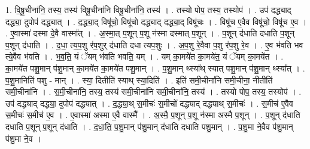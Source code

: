 \documentclass[17pt]{extarticle}
\begin{document}
1. वि॒षू॒चीना॑नि॒ तस्य॒ तस्य॑ विषू॒चीना॑नि विषू॒चीना॑नि॒ तस्य॑ । . तस्यो पोप॒ तस्य॒ तस्योप॑ । . उप॑ दद्ध्याद् दद्ध्या॒ दुपोप॑ दद्ध्यात् । . द॒द्ध्या॒द् विषू॑चो॒ विषू॑चो दद्ध्याद् दद्ध्या॒द् विषू॑चः । . विषू॑च ए॒वैव विषू॑चो॒ विषू॑च ए॒व । . ए॒वास्मा॑ दस्मा दे॒वै वास्मा᳚त् । . अ॒स्मा॒त् प॒शून् प॒शू न॑स्मा दस्मात् प॒शून् । . प॒शून् द॑धाति दधाति प॒शून् प॒शून् द॑धाति । . द॒धा॒ त्य॒प॒शु र॑प॒शुर् द॑धाति दधा त्यप॒शुः । . अ॒प॒शु रे॒वैवा प॒शु र॑प॒शु रे॒व । . ए॒व भ॑वति भव त्ये॒वैव भ॑वति । . भ॒व॒ति॒ यं ॅयम् भ॑वति भवति॒ यम् । . यम् का॒मये॑त का॒मये॑त॒ यं ॅयम् का॒मये॑त । . का॒मये॑त पशु॒मान् प॑शु॒मान् का॒मये॑त का॒मये॑त पशु॒मान् । . प॒शु॒मान् थ्स्या᳚थ् स्यात् पशु॒मान् प॑शु॒मान् थ्स्या᳚त् । . प॒शु॒मानिति॑ पशु - मान् । . स्या॒ दितीति॑ स्याथ् स्या॒दिति॑ । . इति॑ समी॒चीना॑नि समी॒चीना॒ नीतीति॑ समी॒चीना॑नि । . स॒मी॒चीना॑नि॒ तस्य॒ तस्य॑ समी॒चीना॑नि समी॒चीना॑नि॒ तस्य॑ । . तस्यो पोप॒ तस्य॒ तस्योप॑ । . उप॑ दद्ध्याद् दद्ध्या॒ दुपोप॑ दद्ध्यात् । . द॒द्ध्या॒थ् स॒मीचः॑ स॒मीचो॑ दद्ध्याद् दद्ध्याथ् स॒मीचः॑ । . स॒मीच॑ ए॒वैव स॒मीचः॑ स॒मीच॑ ए॒व । . ए॒वास्मा॑ अस्मा ए॒वै वास्मै᳚ । . अ॒स्मै॒ प॒शून् प॒शू न॑स्मा अस्मै प॒शून् । . प॒शून् द॑धाति दधाति प॒शून् प॒शून् द॑धाति । . द॒धा॒ति॒ प॒शु॒मान् प॑शु॒मान् द॑धाति दधाति पशु॒मान् । . प॒शु॒मा ने॒वैव प॑शु॒मान् प॑शु॒मा ने॒व । \newline
\end{document}
